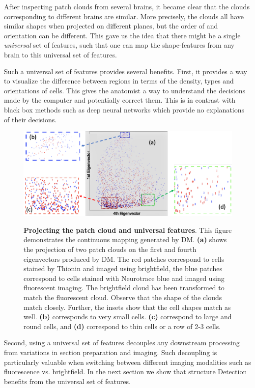 \documentclass[runningheads]{llncs}
\begin{document}
\begin{enumerate}
After inspecting patch clouds from several brains, it became clear
that the clouds corresponding to different brains are similar. More
precisely, the clouds all have similar shapes when projected on
different planes, but the order of and orientation can be
different. This gave us the idea that there might be a single {\em
  universal} set of features, such that one can map the shape-features from
any brain to this universal set of features.

Such a universal set of features provides several benefits. First, it
provides a way to visualize the difference between regions in terms of
the density, types and orientations of cells. This gives
the anatomist a way to understand the decisions made by the computer
and potentially correct them. This is in contrast with black box
methods such as deep neural networks which provide no explanations of
their decisions.

\begin{figure} [t]
  \includegraphics[width=\textwidth]{Images/Scatter.png}
\label{fig:diffusionmap}
\caption{{\bf Projecting the patch cloud and universal features}. This
  figure demonstrates the continuous mapping generated by DM. {\bf
    (a)} shows the projection of two patch clouds on the first and
  fourth eigenvectors produced by DM. The red patches correspond to
  cells stained by Thionin and imaged using brightfield, the blue
  patches correspond to cells stained with Neurotrace blue and imaged
  using fluorescent imaging. The brightfield cloud has been
  transformed to match the fluorescent cloud. Observe that the shape
  of the clouds match closely. Further, the insets show that the cell
  shapes match as well.  {\bf (b)} corresponds to very
  small cells. {\bf (c)} correspond to large and round cells, and {\bf
    (d)} correspond to thin cells or a row  of 2-3 cells.}
\end{figure}
Second, using a universal set of features decouples any downstream processing from
variations in section preparation and imaging. Such decoupling is particularly
valuable when switching between different imaging modalities such as
fluorescence vs. brightfield. In the next section we show that
structure Detection benefits from the universal set of features.


\end{enumerate}
\end{document}
